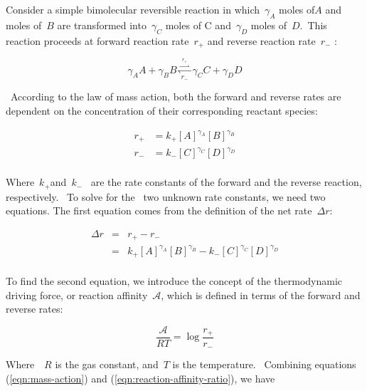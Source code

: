 \documentclass[10pt]{article}
\begin{document}
Consider a simple bimolecular reversible reaction in
which~\(\gamma_A\) moles of\(A\) and moles
of~\(B\) are transformed into~\(\gamma_C\) moles of C
and~\(\gamma_D\) moles of~\(D\).~This reaction
proceeds at forward reaction rate~\(r_+\) and reverse
reaction rate~\(r_-\) :

\begin{equation}\label{eqn:simple_reaction_scheme}
\gamma_A A + \gamma_B B \overset{\overset{r_+}{\rightharpoonup}}{\underset{r_-}{\leftharpoondown}} \gamma_C C + \gamma_D D
\end{equation}

~According to the law of mass action, both the forward and reverse rates
are dependent on the concentration of their corresponding reactant
species:

\begin{eqnarray}\label{eqn:mass-action}
r_+  & =  k_+[A]^{\gamma_A}[B]^{\gamma_B} \\
r_-  & =  k_-[C]^{\gamma_C}[D]^{\gamma_D} \\
\end{eqnarray}

Where~\(k_+\)and~\(k_-\)~ are the rate constants
of the forward and the reverse reaction, respectively.~ To solve for
the~ two unknown rate constants, we need two equations. The first
equation comes from the definition of the net rate~\(\Delta r\):

\begin{eqnarray}\label{eqn:flux-def}
\Delta r & = &r_+-r_- \\
&= &  k_+[A]^{\gamma_A}[B]^{\gamma_B} -  k_-[C]^{\gamma_C}[D]^{\gamma_D} \\
\end{eqnarray}

To find the second equation, we introduce the concept of the
thermodynamic driving force, or reaction affinity~\(\mathcal A\),
which is defined in terms of the forward and reverse rates:

\par\null

\begin{equation}\label{eqn:reaction-affinity-ratio}
\frac{\mathcal A}{RT}= \log\frac{r_+}{r_-} 
\end{equation}

Where~~\(R\) is the gas constant, and~\(T\) is
the temperature.~ Combining equations
({\ref{eqn:mass-action}}) and
({\ref{eqn:reaction-affinity-ratio}}), we have

\par\null
\end{document}
